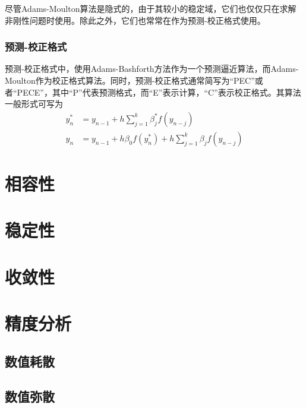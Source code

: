 尽管Adams-Moulton算法是隐式的，由于其较小的稳定域，它们也仅仅只在求解非刚性问题时使用。除此之外，它们也常常在作为预测-校正格式使用。
\subsubsection{预测-校正格式}
预测-校正格式中，使用Adams-Bashforth方法作为一个预测逼近算法，而Adams-Moulton作为校正格式算法。同时，预测-校正格式通常简写为“PEC”或者“PECE”，其中“P”代表预测格式，而“E”表示计算，“C”表示校正格式。其算法一般形式可写为
\begin{subequations}
\begin{align}
y_n^*&=y_{n-1}+h\sum_{j=1}^{k}\beta_j^*f(y_{n-j})\\
y_n&=y_{n-1}+h\beta_0f(y_n^*)+h\sum_{j=1}^{k}\beta_jf(y_{n-j})
\end{align}
\end{subequations}




















\section{相容性}

\section{稳定性}

\section{收敛性}

\section{精度分析}

\subsection{数值耗散}

\subsection{数值弥散}

